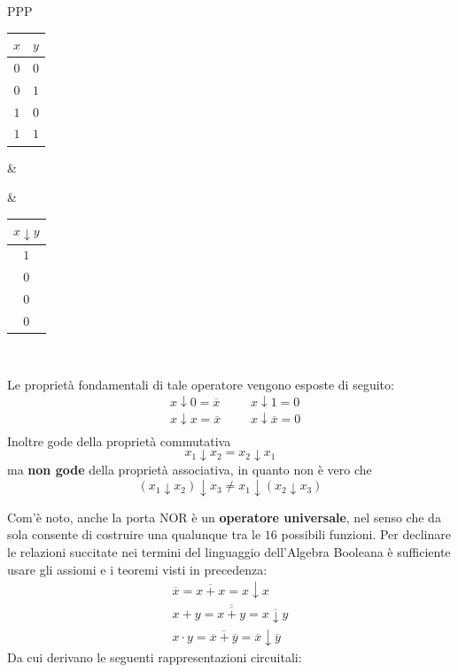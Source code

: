 \documentclass[a4paper]{extarticle}
\begin{document}
\begin{itemize}
    \vspace{1em}
    \noindent
    \begin{tabularx}{\textwidth}{PPP}
    {
        \begin{tabular}{c|c}
             \(x\) & \(y\)\\
             \hline
             $0$ & $0$\\
             $0$ & $1$\\
             $1$ & $0$\\
             $1$ & $1$
        \end{tabular}
    }
    &
    {
    }
    &
    {
        \begin{tabular}{c}
             \(x \downarrow y\)\\
             \hline
             $1$\\
             $0$\\
             $0$\\
             $0$
        \end{tabular}
    }\\
    \end{tabularx}
    \vspace{1em}
    \noindent
    Le proprietà fondamentali di tale operatore vengono esposte di seguito:
    \begin{align*}
        &x \downarrow 0 = \overline{x} && &x \downarrow 1 =0\\
        &x \downarrow x = \overline{x} && &x \downarrow \overline{x}=0\\
    \end{align*}
    Inoltre gode della proprietà commutativa
    \[x_1 \downarrow x_2 = x_2 \downarrow x_1\]
    ma \textbf{non gode} della proprietà associativa, in quanto non è vero che
    \[(x_1 \downarrow x_2) \downarrow x_3 \neq x_1 \downarrow (x_2 \downarrow x_3)\]

    \vspace{1em}
    \noindent
    Com'è noto, anche la porta NOR è un \textbf{operatore universale}, nel senso che da sola consente di costruire una qualunque tra le \(16\) possibili funzioni. Per declinare le relazioni succitate nei termini del linguaggio dell'Algebra Booleana è sufficiente usare gli assiomi e i teoremi visti in precedenza:
    \begin{align*}
        \overline{x} = \overline{x + x} = x \downarrow x\\
        x + y = \overline{\overline{x + y}} = \overline{x \downarrow y}\\
        x \cdot y = \overline{\overline{x} + \overline{y}} = \overline{x} \downarrow \overline{y}
     \end{align*}
     Da cui derivano le seguenti rappresentazioni circuitali:


\end{itemize}
\end{document}
